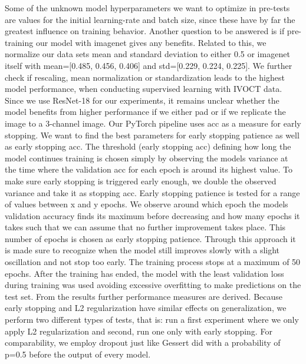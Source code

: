 Some of the unknown model hyperparameters we want to optimize in pre-tests are values for the initial \gls{learning-rate} and batch size, since these have by far the greatest influence on training behavior.
%
Another question to be answered is if pre-training our model with \Gls{imagenet} gives any benefits. Related to this, we normalize our data sets mean and standard deviation to either 0.5 or \Gls{imagenet} itself with mean=[0.485, 0.456, 0.406] and std=[0.229, 0.224, 0.225]. We further check if rescaling, mean normalization or standardization leads to the highest model performance, when conducting supervised learning with IVOCT data.
%
Since we use ResNet-18 for our experiments, it remains unclear whether the model benefits from higher performance if we either pad or if we replicate the image to a 3-channel image.
%
Our PyTorch pipeline uses \acrshort{acc} as a measure for early stopping. We want to find the best parameters for early stopping patience as well as early stopping \acrshort{acc}. The threshold (early stopping \acrshort{acc}) defining how long the model continues training is chosen simply by observing the models variance at the time where the validation \acrshort{acc} for each epoch is around its highest value. To make sure early stopping is triggered early enough, we double the observed variance and take it as stopping \acrshort{acc}. Early stopping patience is tested for a range of values between x and y epochs. We observe around which epoch the models validation accuracy finds its maximum before decreasing and how many epochs it takes such that we can assume that no further improvement takes place. This number of epochs is chosen as early stopping patience.
%
Through this approach it is made sure to recognize when the model still improves slowly with a slight oscillation and not stop too early. The training process stops at a maximum of 50 epochs. After the training has ended, the model with the least validation loss during training was used avoiding excessive overfitting to make predictions on the test set. From the results further performance measures are derived.
%
Because early stopping and L2 regularization have similar effects on generalization, we perform two different types of tests, that is: run a first experiment where we only apply L2 regularization and second, run one only with early stopping.
%
For comparability, we employ dropout just like Gessert did \cite{Gessert.2018} with a probability of p=0.5 before the output of every model.


